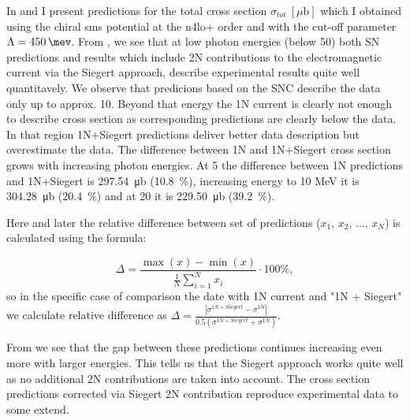     In  and  
    I present predictions for the
    total cross section $\sigma_{tot}~[\mu\text{b}]$ which I obtained
    using the chiral \gls{sms} potential at the \gls{n4lo+} order and with 
    the cut-off parameter $\Lambda=\SI{450}{\mev}$.
    From , we see that at low photon energies
    (below \SI{50}{\mev})
    both SN predictions and results which include 2N contributions
    to the electromagnetic current
    via the Siegert approach, describe experimental results quite well quantitavely.
    We observe that predicions based on the SNC describe the data 
    only up to approx. \SI{10}{\mev}.
    Beyond that energy
    the 1N current is clearly not enough
    to describe cross section 
    as corresponding predictions are clearly below the data.
    In that region 1N+Siegert predictions deliver better data description but 
    overestimate the data.
    The difference between 1N and 1N+Siegert cross section grows with increasing photon energies.
    At \SI{5}{\mev} the difference between 1N predictions
    and 1N+Siegert is \SI{297.54}{\micro\barn} (\SI{10.8}{\percent}), increasing energy to 10 MeV
    it is \SI{304.28}{\micro\barn} (\SI{20.4}{\percent})
    and at \SI{20}{\mev} it is \SI{229.50}{\micro\barn} (\SI{39.2}{\percent}).
    
    Here and later the relative difference between set of predictions ($x_1$, $x_2$, ..., $x_N$) is calculated
    using the formula:

    \begin{equation}
        \Delta = \frac{\max(x) - \min(x)}{\frac{1}{N}\sum_{i=1}^N x_i} \cdot 100\%,
        \label{eq:relative_diff}
    \end{equation}
    so in the specific case of comparison the date with 1N current and "1N + Siegert" we
    calculate relative difference as 
    $\Delta = \frac{|\sigma^{1N+Siegert} - \sigma^{1N}|}{0.5(\sigma^{1N+Siegert} + \sigma^{1N})}$.
    
    From  we see that the gap between these predictions
    continues increasing even more with larger energies.
    This tells us that the Siegert approach works quite well as no additional 2N contributions are taken into account.
    The cross section predictions corrected via Siegert 2N contribution  reproduce 
    experimental data to some extend.
    
